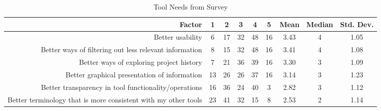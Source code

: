 \begin{table*}[!]
\renewcommand{\arraystretch}{1.3}
\caption{Tool Needs from Survey}
\label{survey_tool_needs}
\centering
\begin{tabularx}{0.9\textwidth}{r | *5{c} | *3{c}}

\toprule
	Factor & 1 & 2 & 3 & 4 & 5 & Mean & Median & Std. Dev. \\
\midrule
	Better usability & 6 & 17 & 32 & 48 & 16 & 3.43 & 4 & 1.05\\
	Better ways of filtering out less relevant information & 8 & 15 & 32 & 48 & 16 & 3.41 & 4 & 1.08\\
	Better ways of exploring project history & 7 & 21 & 36 & 39 & 16 & 3.30 & 3 & 1.09\\
	Better graphical presentation of information & 13 & 26 & 26 & 37 & 16 & 3.14 & 3 & 1.23\\
	Better transparency in tool functionality/operations & 16 & 36 & 24 & 40 & 3 & 2.82 & 3 & 1.12\\
	Better terminology that is more consistent with my other tools & 23 & 41 & 32 & 15 & 8 & 2.53 & 2 & 1.14\\
	\bottomrule
\end{tabularx}
\end{table*}